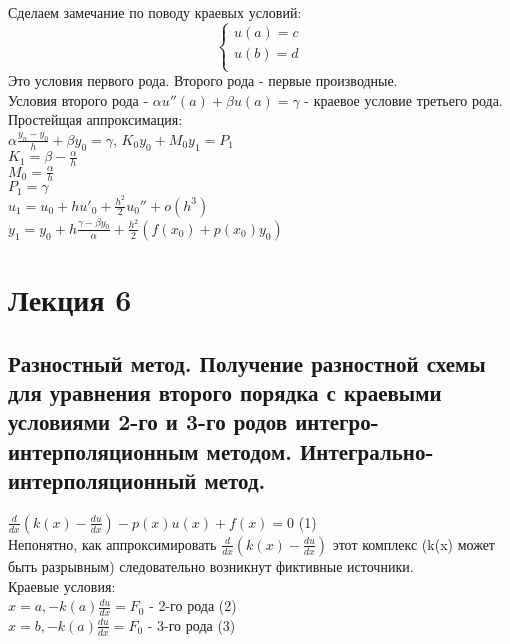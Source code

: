 Сделаем замечание по поводу краевых условий:\\
\begin{equation}
\begin{cases}
u(a) = c\\
u(b) = d\\
\end{cases}
\end{equation}
Это условия первого рода. Второго рода - первые производные.\\
Условия второго рода - $\alpha u''(a) + \beta u(a) = \gamma$ - краевое условие третьего рода.\\

Простейщая аппроксимация:\\
$\alpha\frac{y_{n} - y_{0}}{h} + \beta y_{0} = \gamma$, $K_{0} y_{0} + M_{0} y_{1} = P_{1}$\\
$K_{1} = \beta - \frac{\alpha}{h}$\\
$M_{0} = \frac{\alpha}{h}$\\
$P_{1} = \gamma$\\

$u_{1} = u_{0} + h u'_{0} + \frac{h^{2}}{2}u_{0}'' +  o(h^{3})$\\
$y_{1} = y_{0} + h \frac{\gamma - \beta y_{0}}{\alpha} + \frac{h^{2}}{2} (f(x_{0}) + p(x_{0}) y_{0})$\\

\chapter{Лекция 6}
\section{Разностный метод. Получение разностной схемы для уравнения второго порядка с краевыми условиями 2-го и 3-го родов интегро-интерполяционным методом. Интегрально-интерполяционный метод.}

$\frac{d}{dx}(k(x) - \frac{du}{dx}) - p(x)u(x) + f(x) = 0$ (1)\\

Непонятно, как аппроксимировать $\frac{d}{dx}(k(x) - \frac{du}{dx})$ этот комплекс (k(x) может быть разрывным) следовательно возникнут фиктивные источники.\\

Краевые условия:\\
$x = a, -k(a)\frac{du}{dx} = F_0$ - 2-го рода (2)\\
$x = b, -k(a)\frac{du}{dx} = F_0$ - 3-го рода (3)\\

